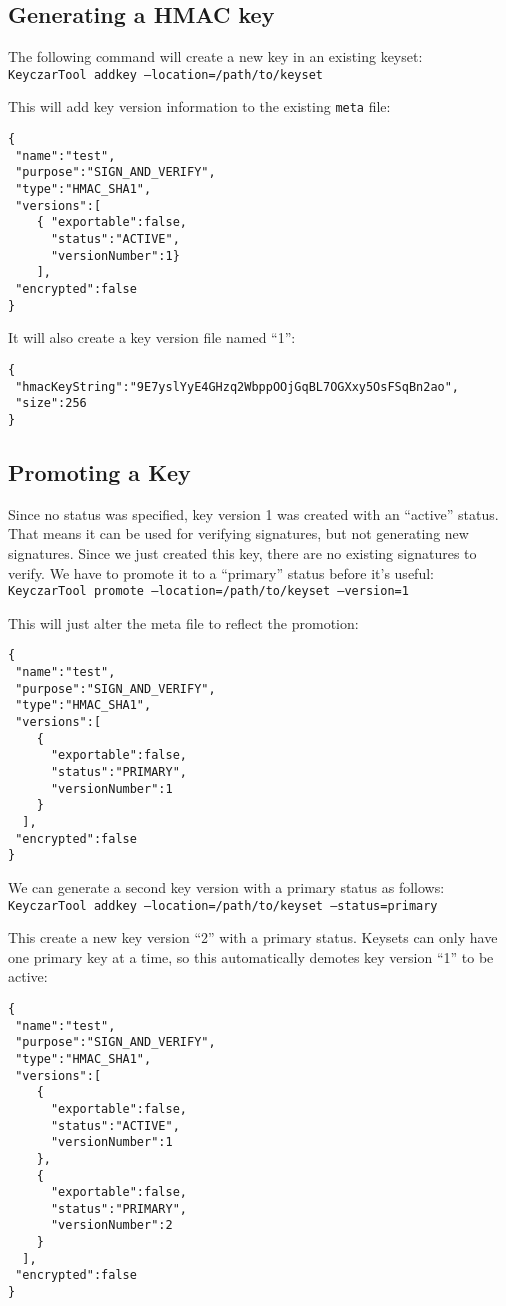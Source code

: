 \documentclass{llncs}
\begin{document}
\subsection{Generating a HMAC key}

The following command will create a new key in an existing keyset: \\
{\tt KeyczarTool addkey --location=/path/to/keyset}

This will add key version information to the existing {\tt meta} file: 
\begin{verbatim}
{
 "name":"test",
 "purpose":"SIGN_AND_VERIFY",
 "type":"HMAC_SHA1",
 "versions":[
    { "exportable":false,
      "status":"ACTIVE",
      "versionNumber":1}
    ],
 "encrypted":false
}
\end{verbatim}

It will also create a key version file named ``1'':
\begin{verbatim}
{
 "hmacKeyString":"9E7yslYyE4GHzq2WbppOOjGqBL7OGXxy5OsFSqBn2ao",
 "size":256
}
\end{verbatim}

\subsection{Promoting a Key}
Since no status was specified, key version 1 was created with an ``active''
status. That means it can be used for verifying signatures, but not generating
new signatures. Since we just created this key, there are no existing
signatures to verify. We have to promote it to a ``primary'' status before
it's useful: \\
{\tt KeyczarTool promote --location=/path/to/keyset --version=1}

This will just alter the meta file to reflect the promotion:
\begin{verbatim}
{
 "name":"test",
 "purpose":"SIGN_AND_VERIFY",
 "type":"HMAC_SHA1",
 "versions":[
    { 
      "exportable":false,
      "status":"PRIMARY",
      "versionNumber":1
    }
  ],
 "encrypted":false
}
\end{verbatim}

We can generate a second key version with a primary status as follows: \\
{\tt KeyczarTool addkey --location=/path/to/keyset --status=primary}

This create a new key version ``2'' with a primary status. Keysets can only have
one primary key at a time, so this automatically demotes key version ``1'' to
be active:
\begin{verbatim}
{
 "name":"test",
 "purpose":"SIGN_AND_VERIFY",
 "type":"HMAC_SHA1",
 "versions":[
    { 
      "exportable":false,
      "status":"ACTIVE",
      "versionNumber":1
    },
    { 
      "exportable":false,
      "status":"PRIMARY",
      "versionNumber":2
    }
  ],
 "encrypted":false
}
\end{verbatim}
\end{document}
